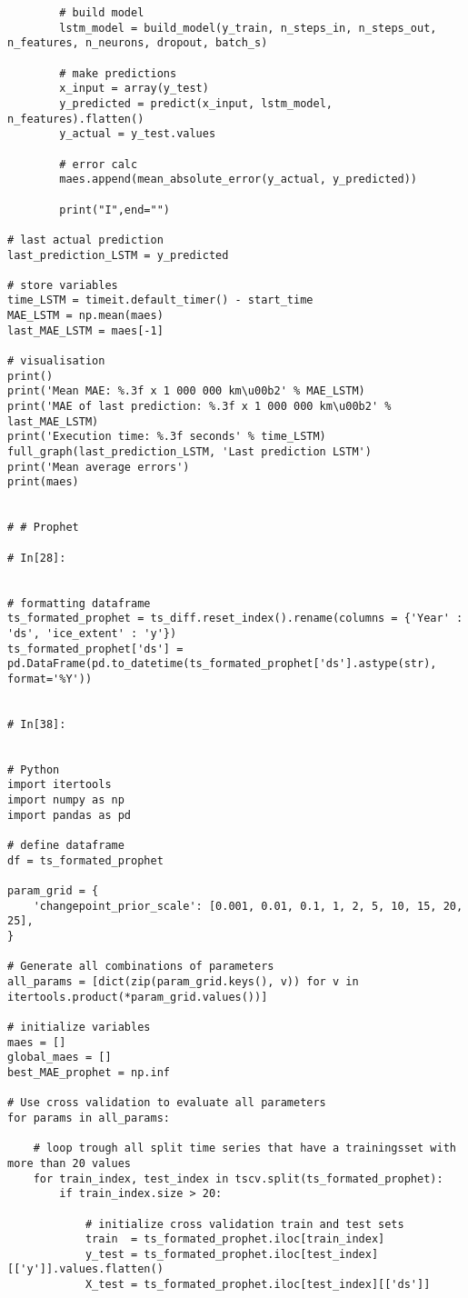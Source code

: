 \begin{verbatim}
        # build model
        lstm_model = build_model(y_train, n_steps_in, n_steps_out, n_features, n_neurons, dropout, batch_s)

        # make predictions
        x_input = array(y_test)
        y_predicted = predict(x_input, lstm_model, n_features).flatten()
        y_actual = y_test.values

        # error calc
        maes.append(mean_absolute_error(y_actual, y_predicted))

        print("I",end="")

# last actual prediction 
last_prediction_LSTM = y_predicted
 
# store variables
time_LSTM = timeit.default_timer() - start_time
MAE_LSTM = np.mean(maes)
last_MAE_LSTM = maes[-1]

# visualisation
print()
print('Mean MAE: %.3f x 1 000 000 km\u00b2' % MAE_LSTM)
print('MAE of last prediction: %.3f x 1 000 000 km\u00b2' % last_MAE_LSTM)
print('Execution time: %.3f seconds' % time_LSTM)
full_graph(last_prediction_LSTM, 'Last prediction LSTM')
print('Mean average errors')
print(maes)


# # Prophet

# In[28]:


# formatting dataframe
ts_formated_prophet = ts_diff.reset_index().rename(columns = {'Year' : 'ds', 'ice_extent' : 'y'})
ts_formated_prophet['ds'] = pd.DataFrame(pd.to_datetime(ts_formated_prophet['ds'].astype(str), format='%Y'))


# In[38]:


# Python
import itertools
import numpy as np
import pandas as pd

# define dataframe
df = ts_formated_prophet

param_grid = {  
    'changepoint_prior_scale': [0.001, 0.01, 0.1, 1, 2, 5, 10, 15, 20, 25],
}

# Generate all combinations of parameters
all_params = [dict(zip(param_grid.keys(), v)) for v in itertools.product(*param_grid.values())]

# initialize variables
maes = []  
global_maes = []
best_MAE_prophet = np.inf

# Use cross validation to evaluate all parameters
for params in all_params:

    # loop trough all split time series that have a trainingsset with more than 20 values
    for train_index, test_index in tscv.split(ts_formated_prophet):    
        if train_index.size > 20:  
            
            # initialize cross validation train and test sets
            train  = ts_formated_prophet.iloc[train_index]
            y_test = ts_formated_prophet.iloc[test_index][['y']].values.flatten()
            X_test = ts_formated_prophet.iloc[test_index][['ds']]


\end{verbatim}
